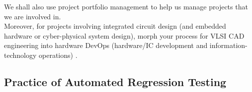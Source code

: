 \documentclass[letter,12pt]{article}
\begin{document}
We shall also use project portfolio management \cite{Rothman2016a,Rothman2009} to help us manage projects that we are involved in. \\







Moreover, for projects involving integrated circuit design (and embedded hardware or cyber-physical system design), morph your process for VLSI CAD engineering into hardware DevOps (hardware/IC development and information-technology operations) \cite{MythicIncStaff2018}.



















\subsection{Practice of Automated Regression Testing}
\label{ssec:PracticeOfAutomatedRegressionTesting}
\end{document}
